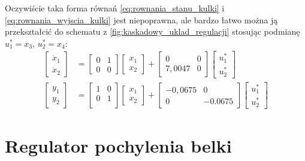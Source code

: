 Oczywiście taka forma równań \eqref{eq:rownania_stanu_kulki} i \eqref{eq:rownania_wyjscia_kulki} jest niepoprawna, ale bardzo łatwo można ją przekształcić do schematu z \cref{fig:kaskadowy_uklad_regulacji} stosując podmianę $u_1^* = x_3$, $u_2^* = x_4$: %
\begin{align}
\begin{bmatrix}
    \dot{x}_1 \\ \dot{x}_2
\end{bmatrix}
&= \begin{bmatrix}
    0 & 1 \\
    0 & 0
\end{bmatrix}
\begin{bmatrix}
x_1 \\ x_2
\end{bmatrix}
+
\begin{bmatrix}
    0 & 0 \\ 7,0047 & 0
\end{bmatrix}
\begin{bmatrix}
    u_1^* \\ u_2^*
\end{bmatrix} \label{eq:rownania_stanu_kulki2} \\
\begin{bmatrix}
    y_1 \\ y_2
\end{bmatrix}
&= \begin{bmatrix}
    1 & 0 \\
    0 & 1 \\
\end{bmatrix}
\begin{bmatrix}
    x_1 \\ x_2
\end{bmatrix}
+ \begin{bmatrix}
    -0,0675 & 0 \\
    0 & -0.0675
\end{bmatrix}
\begin{bmatrix}
    u_1^* \\ u_2^*
\end{bmatrix} \label{eq:rownania_wyjscia_kulki2}
\end{align}

\section{Regulator pochylenia belki}
\label{sec:ch6_regulator_belki}

